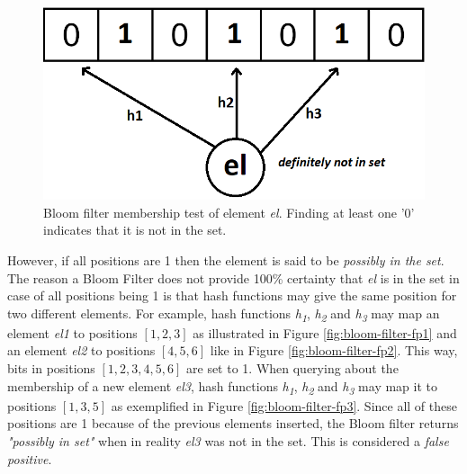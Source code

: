 \begin{figure}[!htb]
    \begin{center}
      \includegraphics[scale=0.4]{figures/query-bloom.png}
      \caption[Bloom filter membership test]{Bloom filter membership test of element \textit{el}. Finding at least one '0' indicates that it is not in the set.}
      \label{fig:bloom-filter}
    \end{center}
\end{figure}

However, if all positions are 1 then the element is said to be \textit{possibly in the set}. The reason a Bloom Filter does not provide 100\% certainty that \textit{el} is in the set in case of all positions being 1 is that hash functions may give the same position for two different elements. For example, hash functions \textit{h\textsubscript{1}}, \textit{h\textsubscript{2}} and \textit{h\textsubscript{3}} may map an element \textit{el1} to positions $[1,2,3]$ as illustrated in Figure \ref{fig:bloom-filter-fp1} and an element \textit{el2} to positions $[4,5,6]$ like in Figure \ref{fig:bloom-filter-fp2}. This way, bits in positions $[1,2,3,4,5,6]$ are set to 1. When querying about the membership of a new element \textit{el3}, hash functions \textit{h\textsubscript{1}}, \textit{h\textsubscript{2}} and \textit{h\textsubscript{3}} may map it to positions $[1,3,5]$ as exemplified in Figure \ref{fig:bloom-filter-fp3}. Since all of these positions are 1 because of the previous elements inserted, the Bloom filter returns \textit{"possibly in set"} when in reality \textit{el3} was not in the set. This is considered a \textit{false positive}.


